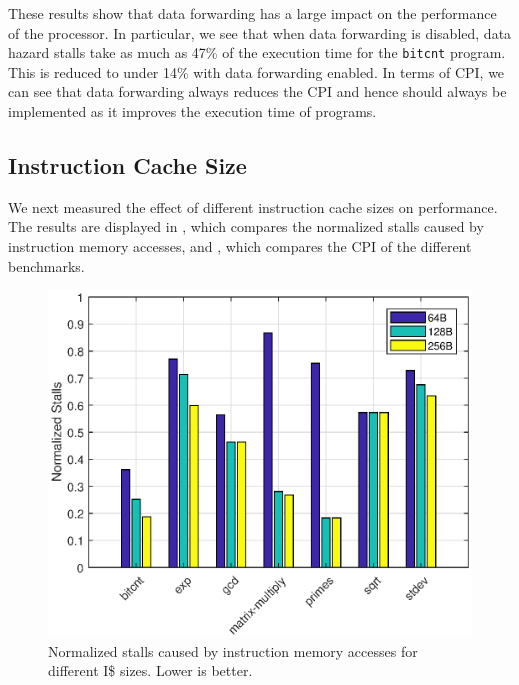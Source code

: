 \documentclass[conference, hidelinks]{IEEEtran}
\begin{document}
These results show that data forwarding has a large impact on the performance of the processor. In particular, we see that when data forwarding is disabled, data hazard stalls take as much as 47\% of the execution time for the \texttt{bitcnt} program. This is reduced to under 14\% with data forwarding enabled. In terms of CPI, we can see that data forwarding always reduces the CPI and hence should always be implemented as it improves the execution time of programs.

\subsection{Instruction Cache Size}

We next measured the effect of different instruction cache sizes on performance. The results are displayed in , which compares the normalized stalls caused by instruction memory accesses, and , which compares the CPI of the different benchmarks.

\begin{figure}[!htb]
  \centering
  \includegraphics[width=0.775\columnwidth]{plots/instruction_cache_stalls.eps}
  \caption{Normalized stalls caused by instruction memory accesses for different I\$ sizes. Lower is better.}
  \label{fig:instruction_cache_stalls}
\end{figure}
\end{document}
